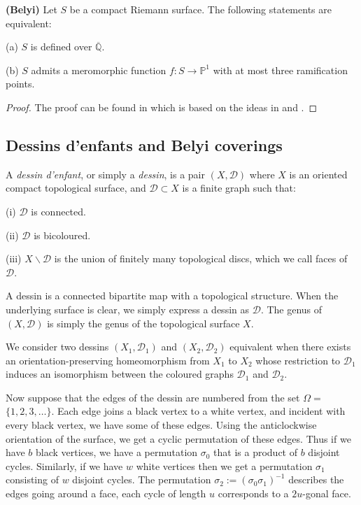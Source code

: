 \vskip5pt

\begin{thm}
  {\bf (Belyi)} Let $S$ be a compact Riemann surface. The following statements are equivalent:

(a) $S$ is defined over $\overline{\mathbb{Q}}$.

(b) $S$ admits a meromorphic function $f: S \rightarrow \mathbb{P}^{1}$ with at most three ramification points.  
\end{thm} 

\begin{proof}
The proof can be found in \cite{Kurk} which is based on the ideas in \cite{GirGon} and \cite{Kock}.
\end{proof}


\vskip5pt


\subsection{Dessins d’enfants and Belyi coverings}
\begin{dfn}
 A \textit{dessin d'enfant}, or simply a \textit{dessin}, is a pair $(X, \mathcal{D})$ where $X$ is an oriented compact topological surface, and $\mathcal{D} \subset X$ is a finite graph such that:

(i) $\mathcal{D}$ is connected.

(ii) $\mathcal{D}$ is bicoloured.

(iii) $X \backslash \mathcal{D}$ is the union of finitely many topological discs, which we call faces of $\mathcal{D}$.   
\end{dfn}

 A dessin is a connected bipartite map with a topological structure. When the underlying surface is clear, we simply express a dessin as $\mathcal{D}$.
The genus of $(X, \mathcal{D})$ is simply the genus of the topological surface $X$.


\begin{dfn} We consider two dessins $\left(X_{1}, \mathcal{D}_{1}\right)$ and $\left(X_{2}, \mathcal{D}_{2}\right)$ equivalent when there exists an orientation-preserving homeomorphism from $X_{1}$ to $X_{2}$ whose restriction to $\mathcal{D}_{1}$ induces an isomorphism between the coloured graphs $\mathcal{D}_{1}$ and $\mathcal{D}_{2}$.
\end{dfn}

Now suppose that the edges of the dessin are numbered from the set $\Omega=$ $\{1,2,3, \ldots\}$. Each edge joins a black vertex to a white vertex, and incident with every black vertex, we have some of these edges. Using the anticlockwise orientation of the surface, we get a cyclic permutation of these edges. Thus if we have $b$ black vertices, we have a permutation $\sigma_{0}$ that is a product of $b$ disjoint cycles. Similarly, if we have $w$ white vertices then we get a permutation $\sigma_{1}$ consisting of $w$ disjoint cycles. The permutation $\sigma_{2}:=\left(\sigma_{0} \sigma_{1}\right)^{-1}$ describes the edges going around a face, each cycle of length $u$ corresponds to a $2 u$-gonal face.

